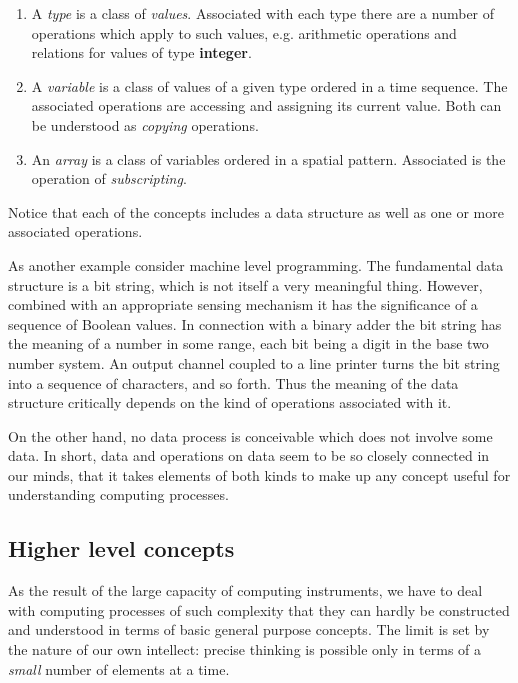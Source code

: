 \documentclass[twoside,11pt]{book}
\begin{document}
\begin{enumerate}[wide, nosep, label=(\arabic*)]
	\item A \textit{type} is a class of \textit{values}. Associated with each type there are a number of operations which apply to such values, e.g. arithmetic operations and relations for values of type \textbf{integer}.
	\item A \textit{variable} is a class of values of a given type ordered in a time sequence. The associated operations are accessing and assigning its current value. Both can be understood as \textit{copying} operations.
	\item An \textit{array} is a class of variables ordered in a spatial pattern. Associated is the operation of \textit{subscripting}.
\end{enumerate}

Notice that each of the concepts includes a data structure as well as one or more associated operations.

As another example consider machine level programming. The fundamental data structure is a bit string, which is not itself a very meaningful thing. However, combined with an appropriate sensing mechanism it has the significance of a sequence of Boolean values. In connection with a binary adder the bit string has the meaning of a number in some range, each bit being a digit in the base two number system. An output channel coupled to a line printer turns the bit string into a sequence of characters, and so forth. Thus the meaning of the data structure critically depends on the kind of operations associated with it.

On the other hand, no data process is conceivable which does not involve some data. In short, data and operations on data seem to be so closely connected in our minds, that it takes elements of both kinds to make up any concept useful for understanding computing processes.

\subsection{Higher level concepts}

As the result of the large capacity of computing instruments, we have to deal with computing processes of such complexity that they can hardly be constructed and understood in terms of basic general purpose concepts. The limit is set by the nature of our own intellect: precise thinking is possible only in terms of a \textit{small} number of elements at a time.
\end{document}
